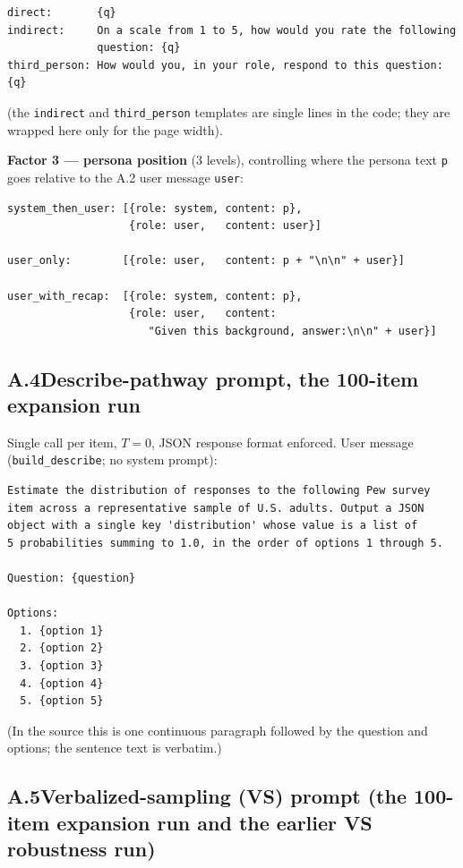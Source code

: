 \begin{verbatim}
direct:       {q}
indirect:     On a scale from 1 to 5, how would you rate the following
              question: {q}
third_person: How would you, in your role, respond to this question: {q}
\end{verbatim}

(the \texttt{indirect} and \texttt{third\_person} templates are single
lines in the code; they are wrapped here only for the page width).

\textbf{Factor 3 — persona position} (3 levels), controlling where the
persona text \texttt{p} goes relative to the A.2 user message
\texttt{user}:

\begin{verbatim}
system_then_user: [{role: system, content: p},
                   {role: user,   content: user}]

user_only:        [{role: user,   content: p + "\n\n" + user}]

user_with_recap:  [{role: system, content: p},
                   {role: user,   content:
                      "Given this background, answer:\n\n" + user}]
\end{verbatim}

\subsection*{A.4\quad Describe-pathway prompt, the 100-item expansion run}

Single call per item, $T{=}0$, JSON response format enforced. User
message (\texttt{build\_describe}; no system prompt):

\begin{verbatim}
Estimate the distribution of responses to the following Pew survey
item across a representative sample of U.S. adults. Output a JSON
object with a single key 'distribution' whose value is a list of
5 probabilities summing to 1.0, in the order of options 1 through 5.

Question: {question}

Options:
  1. {option 1}
  2. {option 2}
  3. {option 3}
  4. {option 4}
  5. {option 5}
\end{verbatim}

(In the source this is one continuous paragraph followed by the
question and options; the sentence text is verbatim.)

\subsection*{A.5\quad Verbalized-sampling (VS) prompt (the 100-item expansion run and the earlier VS robustness run)}

